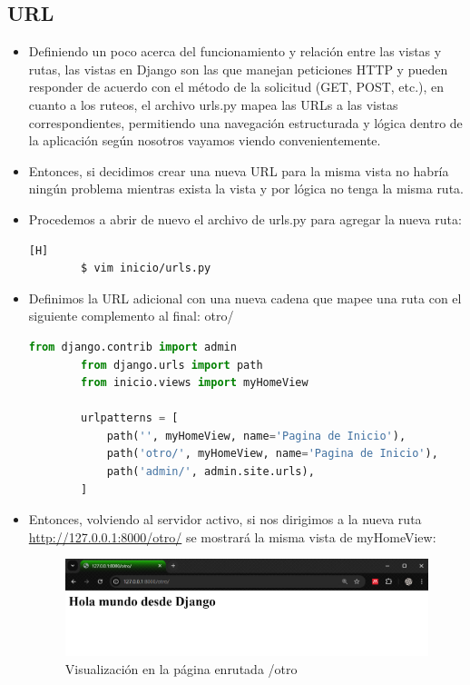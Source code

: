 \documentclass{article}
\begin{document}
        \subsection{URL}
        \begin{itemize}
            \item Definiendo un poco acerca del funcionamiento y relación entre las vistas y rutas, las vistas en Django son las que manejan peticiones HTTP y pueden responder de acuerdo con el método de la solicitud (GET, POST, etc.), en cuanto a los ruteos, el archivo urls.py mapea las URLs a las vistas correspondientes, permitiendo una navegación estructurada y lógica dentro de la aplicación según nosotros vayamos viendo convenientemente.
            \item Entonces, si decidimos crear una nueva URL para la misma vista no habría ningún problema mientras exista la vista y por lógica no tenga la misma ruta.
            \item Procedemos a abrir de nuevo el archivo de urls.py para agregar la nueva ruta:

        \begin{lstlisting}[language=bash,caption={Ingresando a urls.py}][H]
        $ vim inicio/urls.py
        \end{lstlisting}
            \item Definimos la URL adicional con una nueva cadena que mapee una ruta con el siguiente complemento al final: otro/
        
        \begin{lstlisting}[language=Python, caption={Registro de la nueva URL para la vista myHomeView}]
        from django.contrib import admin
        from django.urls import path
        from inicio.views import myHomeView
        
        urlpatterns = [
            path('', myHomeView, name='Pagina de Inicio'),
            path('otro/', myHomeView, name='Pagina de Inicio'),
            path('admin/', admin.site.urls),
        ]
        \end{lstlisting}
        
            \item Entonces, volviendo al servidor activo, si nos dirigimos a la nueva ruta \url{http://127.0.0.1:8000/otro/} se mostrará la misma vista de myHomeView:

        \begin{figure}[H]
            \centering
            \includegraphics[width=1\linewidth]{img/URL2.png}
            \caption{Visualización en la página enrutada /otro}
            \label{fig:enter-label}
        \end{figure}
        

\end{itemize}
\end{document}
